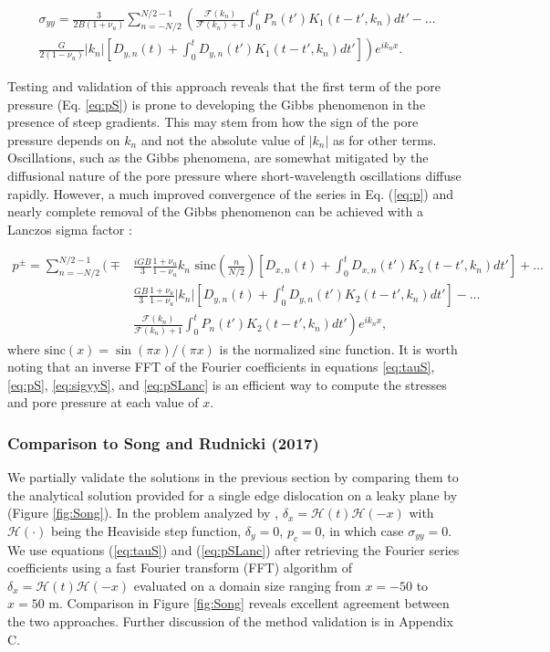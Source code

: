 \documentclass[draft]{agujournal2019}
\begin{document}
\begin{align}
\sigma_{yy} = \frac{3 }{2 B (1 + \nu_u)} \sum_{n = -N/2}^{N/2 - 1} \left( \frac{  \mathcal{F}(k_n) }{\mathcal{F}(k_n) + 1}  \int_0^t P_n(t') K_1(t-t',k_n) dt' \right. - \ldots \nonumber  \\
\left. \frac{G}{2(1-\nu_u)} |k_n| \left[D_{y,n}(t) + \int_0^t D_{y,n}(t') K_1 (t - t',k_n) dt'\right]  \right) e^{ik_n x}.
\label{eq:sigyyS}
\end{align}
	
Testing and validation of this approach reveals that the first term of the pore pressure (Eq. \ref{eq:pS}) is prone to developing the Gibbs phenomenon in the presence of steep gradients. This may stem from  how the sign of the pore pressure depends on $k_n$ and not the absolute value of $|k_n|$ as for other terms. Oscillations, such as the Gibbs phenomena, are somewhat mitigated by the diffusional nature of the pore pressure where short-wavelength oscillations diffuse rapidly. However, a much improved convergence of the series in Eq. (\ref{eq:p}) and nearly complete removal of the Gibbs phenomenon can be achieved with a Lanczos sigma factor \cite{Duchon1979}:

\begin{align}
\label{eq:pSLanc}
p^\pm =   \sum_{n = -N/2}^{N/2 - 1}  \bigg( \mp & \frac{i G B }{3} \frac{1+\nu_u}{1-\nu_u} k_n \text{ sinc} \left( \frac{n}{N/2} \right)  \left[ D_{x,n}(t) + \int_0^t D_{x,n}(t') K_2 (t - t',k_n) dt' \right] + \ldots \nonumber \\ 
 & \frac{G B }{3} \frac{1+\nu_u}{1-\nu_u} |k_n| \left[ D_{y,n}(t) + \int_0^t D_{y,n}(t') K_2 (t - t',k_n) dt' \right] - \dots \nonumber  \\ 
& \left. \frac{  \mathcal{F}(k_n) }{\mathcal{F}(k_n) + 1} \int_0^t P_n(t') K_2 (t - t',k_n) dt'    \right) e^{ik_n x} ,
\end{align}	
where $\text{sinc}(x) = \sin{ (\pi x)}/(\pi x)$ is the normalized sinc function. It is worth noting that an inverse FFT of the Fourier coefficients in equations \ref{eq:tauS}, \ref{eq:pS}, \ref{eq:sigyyS}, and \ref{eq:pSLanc}  is an efficient way to compute the stresses and pore pressure at each value of $x$.

\subsubsection{Comparison to Song and Rudnicki (2017)}
We partially validate the solutions in the previous section by comparing them to the analytical solution provided for a single edge dislocation on a leaky plane by  (Figure \ref{fig:Song}). In the problem analyzed by , $\delta_x = \mathcal{H}(t)\mathcal{H}(-x)$ with $\mathcal{H}(\cdot)$ being the Heaviside step function, $\delta_y = 0$, $p_c = 0$, in which case $\sigma_{yy} = 0$. We use equations (\ref{eq:tauS}) and (\ref{eq:pSLanc}) after retrieving the Fourier series coefficients using a fast Fourier transform (FFT) algorithm of $\delta_x = \mathcal{H}(t)\mathcal{H}(-x)$ evaluated on a domain size ranging from $x = -50$ to $x = 50$ m. Comparison in Figure \ref{fig:Song} reveals excellent agreement between the two approaches.  Further discussion of the method validation is in Appendix C. 
\end{document}
